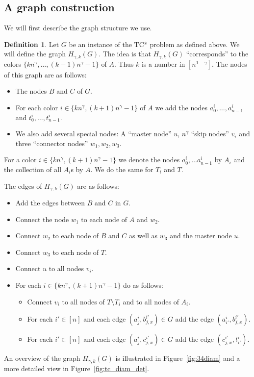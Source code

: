 \documentclass[a4paper,11pt]{article}
\theoremstyle{definition}
\newtheorem{definition}{Definition}
\begin{document}
\subsection{A graph construction}
We will first describe the graph structure we use.

\begin{definition}
    Let $G$ be an instance of the TC* problem as defined above. We will define
    the graph $H_{\gamma,k}(G)$. The idea is that $H_{\gamma,k}(G)$
    ``corresponds'' to the colors $\{kn^\gamma, \ldots,(k+1)n^\gamma -1\}$ of $A$.
    Thus $k$ is a number in $[n^{1-\gamma}]$. The nodes of this graph are as
    follows:
    \begin{itemize}
        \item The nodes $B$ and $C$ of $G$.
        \item For each color $i\in \{kn^\gamma, (k+1)n^\gamma -1\}$ of $A$ we
            add the nodes $a^i_0,\ldots, a^i_{n-1}$ and
            $t^i_0,\ldots,t^i_{n-1}$.
        \item We also add several special nodes: A ``master node'' $u$,
            $n^\gamma$ ``skip nodes'' $v_i$ and three ``connector nodes''
            $w_1,w_2,w_3$.
    \end{itemize}
    For a color $i\in \{kn^\gamma,(k+1)n^\gamma-1\}$ we denote the nodes
    $a^i_0,\ldots a^i_{n-1}$ by $A_i$ and the collection of all $A_i$s by $A$.
    We do the same for $T_i$ and $T$.

    The edges of $H_{\gamma,k}(G)$ are as follows:
    \begin{itemize}
        \item Add the edges between $B$ and $C$ in $G$.
        \item Connect the node $w_1$ to each node of $A$ and $w_2$.
        \item Connect $w_2$ to each node of $B$ and $C$ as well as $w_3$ and
            the master node $u$.
        \item Connect $w_3$ to each node of $T$.
        \item Connect $u$ to all nodes $v_i$.
        \item For each $i\in \{kn^\gamma, (k+1)n^\gamma -1\}$ do as follows:
            \begin{itemize}
                \item Connect $v_i$ to all nodes of $T\setminus T_i$ and to all
                    nodes of $A_i$.
                \item For each $i'\in [n]$ and each edge $(a^i_j,
                    b^{i'}_{j,x})\in G$ add the edge $(a^i_{i'},
                    b^{i'}_{j,x})$.
                \item For each $i'\in [n]$ and each edge $(a^i_j,
                    c^{i'}_{j,x})\in G$ add the edge $(c^{i'}_{j,x},
                    t^i_{i'})$.
            \end{itemize}
    \end{itemize}
\end{definition}
An overview of the graph $H_{\gamma,k}(G)$ is illustrated in Figure~\ref{fig:34diam}
and a more detailed view in Figure~\ref{fig:tc_diam_det}.
\end{document}

